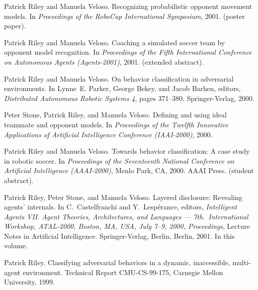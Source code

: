 \documentclass[ComputerScience]{vita}
\begin{document}
\begin{vita}
\begin{Publications}
   \item
    Patrick Riley and Manuela Veloso.
    \newblock Recognizing probabilistic opponent movement models.
    \newblock In {\em Proceedings of the RoboCup International Symposium}, 2001.
    \newblock (poster paper).

   \item
    Patrick Riley and Manuela Veloso.
    \newblock Coaching a simulated soccer team by opponent model recognition.
    \newblock In {\em Proceedings of the Fifth International Conference on
      Autonomous Agents (Agents-2001)}, 2001.
    \newblock (extended abstract).

   \item
    Patrick Riley and Manuela Veloso.
    \newblock On behavior classification in adversarial environments.
    \newblock In Lynne~E. Parker, George Bekey, and Jacob Barhen, editors, {\em
      Distributed Autonomous Robotic Systems 4}, pages 371--380. Springer-Verlag,
    2000.

   \item
    Peter Stone, Patrick Riley, and Manuela Veloso.
    \newblock Defining and using ideal teammate and opponent models.
    \newblock In {\em Proceedings of the Twelfth Innovative Applications of
      Artificial Intelligence Conference (IAAI-2000)}, 2000.

   \item
    Patrick Riley and Manuela Veloso.
    \newblock Towards behavior classification: A case study in robotic soccer.
    \newblock In {\em Proceedings of the Seventeenth National Conference on
      Artificial Intelligence (AAAI-2000)}, Menlo Park, CA, 2000. AAAI Press.
    \newblock (student abstract).

   \item
    Patrick Riley, Peter Stone, and Manuela Veloso.
    \newblock Layered disclosure: Revealing agents' internals.
    \newblock In C.~Castelfranchi and Y.~Lesp\'{e}rance, editors, {\em Intelligent
      Agents VII. Agent Theories, Architectures, and Languages ---
      7th.~International Workshop, ATAL-2000, Boston, MA, USA, July 7--9, 2000,
      Proceedings}, Lecture Notes in Artificial Intelligence. Springer-Verlag,
    Berlin, Berlin, 2001.
    \newblock In this volume.

   \item
    Patrick Riley.
    \newblock Classifying adversarial behaviors in a dynamic, inaccessible,
    multi-agent environment.
    \newblock Technical Report CMU-CS-99-175, Carnegie Mellon University, 1999.


\end{Publications}
\end{vita}
\end{document}
